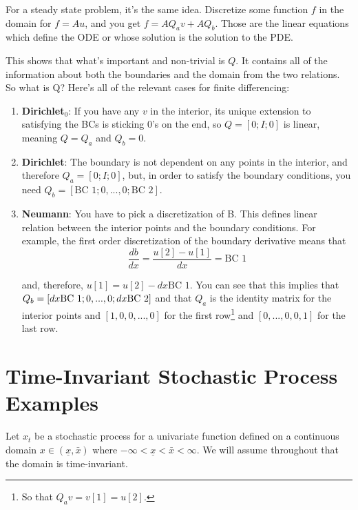 \documentclass[11pt]{article}
\begin{document}
\begin{itemize}
For a steady state problem, it's the same idea. Discretize some function $f$ in the domain for $f = Au$, and you get $f = AQ_av + AQ_b$. Those are the linear equations which define the ODE or whose solution is the solution to the PDE.

This shows that what's important and non-trivial is $Q$. It contains all of the information about both the boundaries and the domain from the two relations. So what is Q? Here's all of the relevant cases for finite differencing:
\begin{enumerate}
	\item \textbf{Dirichlet$_0$}: If you have any $v$ in the interior, its unique extension to satisfying the BCs is sticking $0$'s on the end, so $Q = [0;I;0]$ is linear, meaning $Q = Q_a$ and $Q_b=0$.

	\item \textbf{Dirichlet}: The boundary is not dependent on any points in the interior, and therefore $Q_a = [0;I;0]$, but, in order to satisfy the boundary conditions, you need $ Q_b=[\text{BC 1};0,...,0;\text{BC 2}]$.

	\item \textbf{Neumann}: You have to pick a discretization of B.
	This defines linear relation between the interior points and the boundary conditions. For example, the first order discretization of the boundary derivative means that
	\begin{equation}
	\frac{db}{dx} = \frac{u[2] - u[1]}{dx} = \text{BC 1}
	\end{equation}

	and, therefore, $u[1] = u[2] - dx\text{BC 1}$. You can see that this implies that $Q_b = [dx\text{BC 1};0,...,\\0;dx \text{BC 2}]$ and that $Q_a$ is the identity matrix for the interior points and $[1,0, 0,...,0]$ for the first row\footnote{So that $Q_a v = v[1] = u[2]$.} and $[0,...,0,0,1]$ for the last row.%


\end{enumerate}
\end{itemize}

\section{Time-Invariant Stochastic Process Examples}
Let $x_t$ be a stochastic process for a univariate function defined on a continuous domain $x \in (\underline{x}, \bar{x})$ where $-\infty < \underline{x} < \bar{x} < \infty$.  We will assume throughout that the domain is time-invariant.
\end{document}
